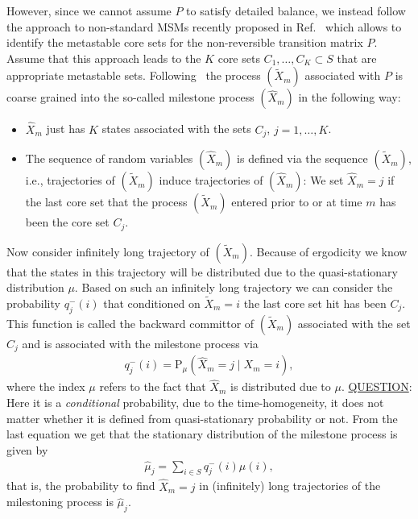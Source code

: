 \documentclass[aps, pre, preprint,unsortedaddress,a4paper,onecolumn]{revtex4}
\newcommand{\recheck}[1]{{\color{red} #1}}
\newcommand{\bwd}[0]{-}
\newcommand{\prob}{\textrm{P}}
\begin{document}
However, since we cannot assume $P$ to satisfy detailed balance, we
instead follow the approach to non-standard MSMs recently proposed in Ref.~\cite{sarich2014utilizing} which allows to identify the metastable core sets for the
non-reversible transition matrix $P$. Assume that this approach leads
to the $K$ core sets $C_1,\ldots, C_K\subset S$ that are appropriate metastable sets. 
Following~\cite{A19-31,schuette2011markov} the process $(\tilde X_m)$ associated with $P$ is coarse grained into the so-called milestone process $(\hat{X}_m)$ in the following way: 
\begin{itemize}
\item $\hat{X}_m$ just has $K$ states associated with the sets $C_j$, $j=1,\ldots,K$. 
\item The sequence of random variables $(\hat{X}_m)$ is defined via the sequence $(\tilde X_m)$, i.e., trajectories of $(\tilde X_m)$ induce trajectories of $(\hat{X}_m)$: We set $\hat{X}_m=j$ if the last core set that the process $(\tilde X_m)$ entered prior to or at time $m$ has been the core set $C_j$.
\end{itemize}
Now consider infinitely long trajectory of $(\tilde X_m)$. Because of ergodicity we know that the states in this trajectory will be distributed due to the quasi-stationary distribution $\mu$. Based on such an infinitely long trajectory we can consider the probability $q_j^\bwd(i)$ that conditioned on $\tilde X_m=i$ the last core set hit has been $C_j$.
This function is called the backward committor of $(\tilde X_m)$ associated with the set $C_j$ and is associated with the milestone process via
\begin{align}
\label{eq:msm-bwd-committor}  
q^\bwd_j(i)=\prob_\mu(\hat{X}_m=j \mid X_m=i),
\end{align}
where  the index $\mu$ refers to the fact that $\hat{X}_m$ is distributed due to $\mu$.
\recheck{\underline{QUESTION}: Here it is a \emph{conditional} probability,
  due to the time-homogeneity,
  it does not matter whether it is defined from quasi-stationary probability
  or not.}
From the last equation we get that the stationary distribution of the milestone process is given by
\begin{align}  
\hat{\mu}_j=\sum_{i\in S} q^\bwd_j(i)\mu(i),
\end{align}
that is, the probability to find $\hat{X}_m=j$ in (infinitely) long trajectories of the milestoning process is $\hat{\mu}_j$.
\end{document}

